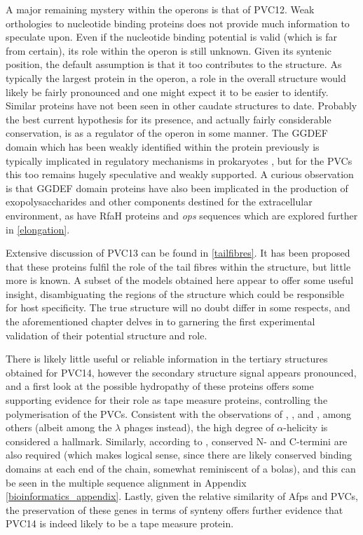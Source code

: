 A major remaining mystery within the operons is that of PVC12. Weak orthologies to nucleotide binding proteins does not provide much information to speculate upon. Even if the nucleotide binding potential is valid (which is far from certain), its role within the operon is still unknown. Given its syntenic position, the default assumption is that it too contributes to the structure. As typically the largest protein in the operon, a role in the overall structure would likely be fairly pronounced and one might expect it to be easier to identify. Similar proteins have not been seen in other caudate structures to date. Probably the best current hypothesis for its presence, and actually fairly considerable conservation, is as a regulator of the operon in some manner. The GGDEF domain which has been weakly identified within the protein previously is typically implicated in regulatory mechanisms in prokaryotes \citep{Paul2004, Ryjenkov2005}, but for the PVCs this too remains hugely speculative and weakly supported. A curious observation is that GGDEF domain proteins have also been implicated in the production of exopolysaccharides and other components destined for the extracellular environment, as have RfaH proteins and \emph{ops} sequences which are explored further in \vref{elongation}.

Extensive discussion of PVC13 can be found in \vref{tailfibres}. It has been proposed that these proteins fulfil the role of the tail fibres within the structure, but little more is known. A subset of the models obtained here appear to offer some useful insight, disambiguating the regions of the structure which could be responsible for host specificity. The true structure will no doubt differ in some respects, and the aforementioned chapter delves in to garnering the first experimental validation of their potential structure and role.

There is likely little useful or reliable information in the tertiary structures obtained for PVC14, however the secondary structure signal appears pronounced, and a first look at the possible hydropathy of these proteins offers some supporting evidence for their role as tape measure proteins, controlling the polymerisation of the PVCs. Consistent with the observations of \cite{Rybakova2015}, \cite{Mahony2016}, and \cite{Katsura1984}, among others (albeit among the $\lambda$ phages instead), the high degree of $\alpha$-helicity is considered a hallmark. Similarly, according to \cite{Mahony2016}, conserved N- and C-termini are also required (which makes logical sense, since there are likely conserved binding domains at each end of the chain, somewhat reminiscent of a bolas), and this can be seen in the multiple sequence alignment in Appendix \vref{bioinformatics_appendix}. Lastly, given the relative similarity of Afps and PVCs, the preservation of these genes in terms of synteny offers further evidence that PVC14 is indeed likely to be a tape measure protein.

